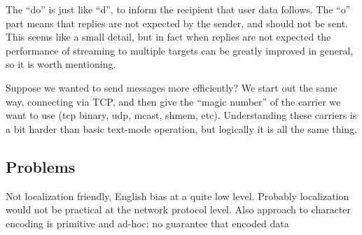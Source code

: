 The ``do'' is just like ``d'', to inform the recipient that user data
follows.  The ``o'' part means that replies are not expected by the
sender, and should not be sent.  This seems like a small detail,
but in fact when replies are not expected the performance of 
streaming to multiple targets can be greatly improved in general,
so it is worth mentioning.

Suppose we wanted to send messages more efficiently?  We start out the
same way, connecting via TCP, and then give the ``magic number'' of
the carrier we want to use (tcp binary, udp, mcast, shmem, etc).
Understanding these carriers is a bit harder than basic text-mode operation,
but logically it is all the same thing.



\subsection{Problems}

Not localization friendly, English bias at a quite low level.
Probably localization would not be practical at the network
protocol level.  Also approach to character encoding is
primitive and ad-hoc; no guarantee that encoded data
